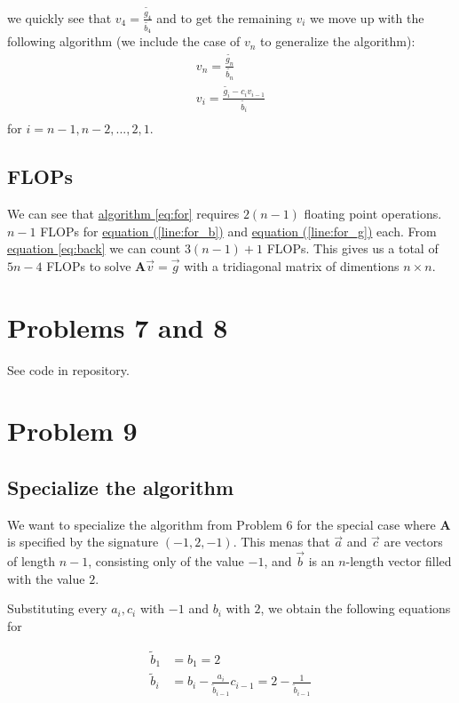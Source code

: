 \documentclass[english,notitlepage]{article}  %
\begin{document}
    we quickly see that $v_4 = \frac{\tilde{g_4}}{\tilde{b_4}}$ and to get the remaining $v_i$ we move up with the following algorithm (we include the case of $v_n$ to generalize the algorithm):
    \begin{gather}\label{eq:back}
        v_n = \frac{\tilde{g_n}}{\tilde{b_n}}\\
        v_i = \frac{\tilde{g_i} - c_iv_{i-1}}{\tilde{b_i}}\\
    \end{gather}
    for $i = n-1, n-2, ..., 2, 1$.

  \subsection*{FLOPs}

    We can see that \hyperref[eq:for]{algorithm \ref*{eq:for}} requires $2(n-1)$ floating point operations. $n-1$ FLOPs for \hyperref[line:for_b]{equation (\ref*{line:for_b})} and \hyperref[line:for_g]{equation (\ref*{line:for_g})} each. From \hyperref[eq:back]{equation \ref*{eq:back}} we can count $3(n-1) + 1$ FLOPs. This gives us a total of $5n - 4$ FLOPs to solve $\boldsymbol{A}\vec{v} = \vec{g}$ with a tridiagonal matrix of dimentions $n\times n$.

\section*{Problems 7 and 8}

See code in repository.

\section*{Problem 9}

  \subsection*{Specialize the algorithm}


    We want to specialize the algorithm from Problem 6 for the special case where $\boldsymbol{A}$ is specified by the signature $(-1, 2, -1)$. This menas that $\vec{a}$ and $\vec{c}$ are vectors of length $n-1$, consisting only of the value $-1$, and $\vec{b}$ is an $n$-length vector filled with the value $2$.

    Substituting every $a_i, c_i$ with $-1$ and $b_i$ with $2$, we obtain the following equations for

    \begin{equation}
      \begin{split}
        \tilde{b}_1 &= b_1 = 2 \\
        \tilde{b}_i &= b_i - \frac{a_i}{\tilde{b}_{i-1}} c_{i-1} = 2 - \frac{1}{\tilde{b}_{i-1}} \\ \label{eqn:specalg_b}
       \end{split}
    \end{equation}
\end{document}
